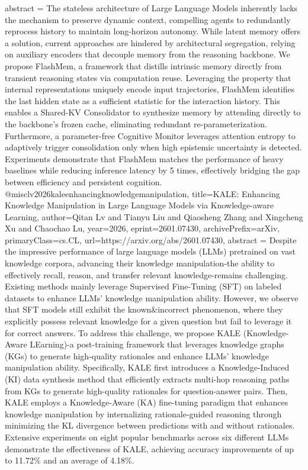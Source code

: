 {      abstract = {The stateless architecture of Large Language Models inherently lacks the mechanism to preserve dynamic context, compelling agents to redundantly reprocess history to maintain long-horizon autonomy. While latent memory offers a solution, current approaches are hindered by architectural segregation, relying on auxiliary encoders that decouple memory from the reasoning backbone. We propose FlashMem, a framework that distills intrinsic memory directly from transient reasoning states via computation reuse. Leveraging the property that internal representations uniquely encode input trajectories, FlashMem identifies the last hidden state as a sufficient statistic for the interaction history. This enables a Shared-KV Consolidator to synthesize memory by attending directly to the backbone's frozen cache, eliminating redundant re-parameterization. Furthermore, a parameter-free Cognitive Monitor leverages attention entropy to adaptively trigger consolidation only when high epistemic uncertainty is detected. Experiments demonstrate that FlashMem matches the performance of heavy baselines while reducing inference latency by 5 times, effectively bridging the gap between efficiency and persistent cognition.}
}@misc{lv2026kaleenhancingknowledgemanipulation,
      title={KALE: Enhancing Knowledge Manipulation in Large Language Models via Knowledge-aware Learning}, 
      author={Qitan Lv and Tianyu Liu and Qiaosheng Zhang and Xingcheng Xu and Chaochao Lu},
      year={2026},
      eprint={2601.07430},
      archivePrefix={arXiv},
      primaryClass={cs.CL},
      url={https://arxiv.org/abs/2601.07430},
      abstract = {Despite the impressive performance of large language models (LLMs) pretrained on vast knowledge corpora, advancing their knowledge manipulation-the ability to effectively recall, reason, and transfer relevant knowledge-remains challenging. Existing methods mainly leverage Supervised Fine-Tuning (SFT) on labeled datasets to enhance LLMs' knowledge manipulation ability. However, we observe that SFT models still exhibit the known&incorrect phenomenon, where they explicitly possess relevant knowledge for a given question but fail to leverage it for correct answers. To address this challenge, we propose KALE (Knowledge-Aware LEarning)-a post-training framework that leverages knowledge graphs (KGs) to generate high-quality rationales and enhance LLMs' knowledge manipulation ability. Specifically, KALE first introduces a Knowledge-Induced (KI) data synthesis method that efficiently extracts multi-hop reasoning paths from KGs to generate high-quality rationales for question-answer pairs. Then, KALE employs a Knowledge-Aware (KA) fine-tuning paradigm that enhances knowledge manipulation by internalizing rationale-guided reasoning through minimizing the KL divergence between predictions with and without rationales. Extensive experiments on eight popular benchmarks across six different LLMs demonstrate the effectiveness of KALE, achieving accuracy improvements of up to 11.72\% and an average of 4.18\%.}
}
